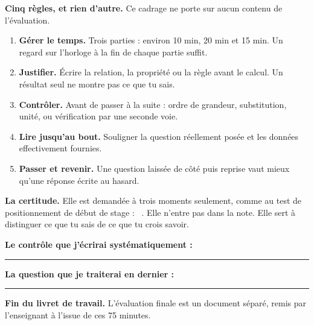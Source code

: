 \documentclass[10pt,a4paper]{article}
\begin{document}
\begin{methodbox}
\textbf{Cinq règles, et rien d'autre.} Ce cadrage ne porte sur aucun contenu de l'évaluation.
\begin{enumerate}
\item \textbf{Gérer le temps.} Trois parties : environ 10 min, 20 min et 15 min. Un regard sur l'horloge à la fin de chaque partie suffit.
\item \textbf{Justifier.} Écrire la relation, la propriété ou la règle avant le calcul. Un résultat seul ne montre pas ce que tu sais.
\item \textbf{Contrôler.} Avant de passer à la suite : ordre de grandeur, substitution, unité, ou vérification par une seconde voie.
\item \textbf{Lire jusqu'au bout.} Souligner la question réellement posée et les données effectivement fournies.
\item \textbf{Passer et revenir.} Une question laissée de côté puis reprise vaut mieux qu'une réponse écrite au hasard.
\end{enumerate}
\end{methodbox}

\begin{graybox}
\textbf{La certitude.} Elle est demandée à trois moments seulement, comme au test de positionnement de début de stage :
\conf\ . Elle n'entre pas dans la note. Elle sert à distinguer ce que tu sais de ce que tu crois savoir.
\end{graybox}

\par\vspace{1mm}
\noindent\textbf{Le contrôle que j'écrirai systématiquement :}\ \rule{\dimexpr\linewidth-76mm\relax}{0.32pt}
\par\vspace{3mm}
\noindent\textbf{La question que je traiterai en dernier :}\ \rule{\dimexpr\linewidth-68mm\relax}{0.32pt}
\par\vspace{1mm}

\begin{warningbox}\textbf{Fin du livret de travail.} L'évaluation finale est un document séparé, remis par l'enseignant à l'issue de ces 75 minutes.\end{warningbox}
\end{document}
